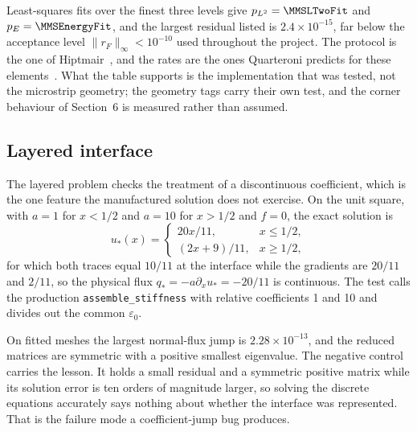 \documentclass[11pt]{article}
\begin{document}
\begin{table}[H]
\centering
\small
\caption{Consecutive manufactured-solution refinements. $N_T$ is the triangle count and
$r_F$ the free-system algebraic residual; all levels use a sparse direct solve.}
\label{tab:mms}
\begingroup
\setlength{\tabcolsep}{3pt}

\endgroup
\end{table}

Least-squares fits over the finest three levels give $p_{L^2}=\MMSLTwoFit$ and
$p_E=\MMSEnergyFit$, and the largest residual listed is $2.4\times10^{-15}$, far below the
acceptance level $\|r_F\|_\infty<10^{-10}$ used throughout the project. The protocol is the
one of Hiptmair~\cite[Sec.~3.8]{hiptmair2025}, and the rates are the ones Quarteroni predicts
for these elements~\cite[Sec.~4.5]{quarteroni2017}. What the table supports is the
implementation that was tested, not the microstrip geometry; the geometry tags carry their
own test, and the corner behaviour of Section~6 is measured rather than assumed.

\subsection{Layered interface}
The layered problem checks the treatment of a discontinuous coefficient, which is the one
feature the manufactured solution does not exercise. On the unit square, with $a=1$ for
$x<1/2$ and $a=10$ for $x>1/2$ and $f=0$, the exact solution is
\[
u_*(x)=\begin{cases}20x/11,&x\le1/2,\\(2x+9)/11,&x\ge1/2,\end{cases}
\]
for which both traces equal $10/11$ at the interface while the gradients are $20/11$ and
$2/11$, so the physical flux $q_*=-a\partial_xu_*=-20/11$ is continuous. The test calls the
production \texttt{assemble\_stiffness} with relative coefficients 1 and 10 and divides out
the common $\varepsilon_0$.

\begin{table}[H]\centering\small
\caption{Layered verification using the production assembly. Odd $N$ leaves the interface
unresolved and tags elements by centroid: it is a negative control, not an acceptable
method.}
\label{tab:layered}
\end{table}

On fitted meshes the largest normal-flux jump is $2.28\times10^{-13}$, and the reduced
matrices are symmetric with a positive smallest eigenvalue. The negative control carries the
lesson. It holds a small residual and a symmetric positive matrix while its solution error is
ten orders of magnitude larger, so solving the discrete equations accurately says nothing
about whether the interface was represented. That is the failure mode a coefficient-jump bug
produces.
\end{document}
